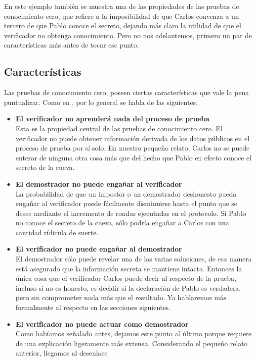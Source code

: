 \documentclass[oneside,10pt]{article}
\begin{document}
En este ejemplo también se muestra una de las propiedades de las pruebas de conocimiento cero, que
refiere a la imposibilidad de que Carlos convenza a un tercero de que Pablo conoce el secreto,
dejando más claro la utilidad de que el verificador no obtenga conocimiento. Pero no nos adelantemos, primero un par de características más antes de tocar
ese punto. 

\subsection{Características}
Las pruebas de conocimiento cero, poseen ciertas características que vale la pena puntualizar. Como
en \cite{simari}, por lo general se habla de las siguientes:
\begin{itemize}
\item\textbf{{El verificador no aprenderá nada del proceso de prueba}} \\
  Esta es la propiedad central de las pruebas de conocimiento cero. El verificador no puede obtener
  información derivada de los datos públicos en el proceso de prueba por sí solo.
  En nuestro pequeño relato, Carlos no se puede enterar de ninguna otra cosa más que del hecho que Pablo
  en efecto conoce el secreto de la cueva.
\item\textbf{{El demostrador no puede engañar al verificador}}\\
  La probabilidad de que un impostor o un demostrador deshonesto pueda engañar al verificador puede fácilmente disminuirse hasta el punto que se desee mediante el incremento
  de rondas ejecutadas en el protocolo. Si Pablo no conoce el secreto de la cueva, sólo podría engañar a Carlos con una cantidad rídicula de suerte. 
\item\textbf{{El verificador no puede engañar al demostrador}}\\
  El demostrador sólo puede revelar una de las varias soluciones, de esa manera está asegurado que
  la información secreta se mantiene intacta. Entonces la única cosa que el verificador Carlos puede decir al respecto de la prueba, incluso si no es honesto, es decidir si la declaración de Pablo es verdadera, pero sin comprometer nada más que el resultado. Ya hablaremos más formalmente al respecto en las secciones siguientes. 
\item\textbf{{El verificador no puede actuar como demostrador}}\\
  Como habíamos señalado antes, dejamos este punto al último porque requiere de una explicación
  ligeramente más extensa. Considerando el pequeño relato anterior, llegamos al desenlace

\end{itemize}
\end{document}
